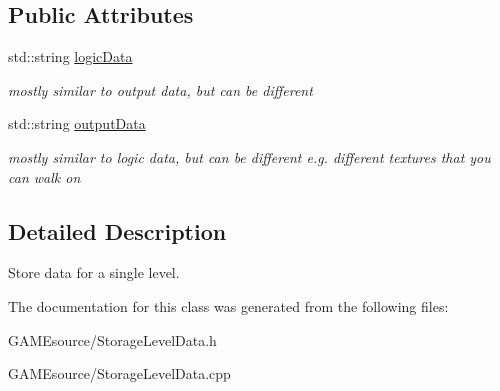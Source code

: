 \subsection*{Public Attributes}
\begin{DoxyCompactItemize}
\item 
\mbox{\label{class_storage_level_data_a18da07c7d59b3339d39a2ad5af2b5202}} 
std\+::string \mbox{\hyperlink{class_storage_level_data_a18da07c7d59b3339d39a2ad5af2b5202}{logic\+Data}}
\begin{DoxyCompactList}\small\item\em mostly similar to output data, but can be different \end{DoxyCompactList}\item 
\mbox{\label{class_storage_level_data_a1a8fbd497e6e534c4edeac01c641448c}} 
std\+::string \mbox{\hyperlink{class_storage_level_data_a1a8fbd497e6e534c4edeac01c641448c}{output\+Data}}
\begin{DoxyCompactList}\small\item\em mostly similar to logic data, but can be different e.\+g. different textures that you can walk on \end{DoxyCompactList}\end{DoxyCompactItemize}


\subsection{Detailed Description}
Store data for a single level. 

The documentation for this class was generated from the following files\+:\begin{DoxyCompactItemize}
\item 
G\+A\+M\+Esource/Storage\+Level\+Data.\+h\item 
G\+A\+M\+Esource/Storage\+Level\+Data.\+cpp\end{DoxyCompactItemize}
